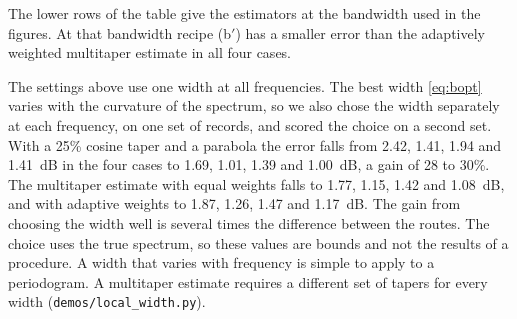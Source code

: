 \documentclass[10pt,twocolumn]{article}
\begin{document}
The lower rows of the table give the estimators at the bandwidth used in the figures. At that bandwidth recipe (b$'$) has a smaller error than the adaptively weighted multitaper estimate in all four cases.

The settings above use one width at all frequencies. The best width \eqref{eq:bopt} varies with the curvature of the spectrum, so we also chose the width separately at each frequency, on one set of records, and scored the choice on a second set. With a 25\% cosine taper and a parabola the error falls from 2.42, 1.41, 1.94 and 1.41~dB in the four cases to 1.69, 1.01, 1.39 and 1.00~dB, a gain of 28 to 30\%. The multitaper estimate with equal weights falls to 1.77, 1.15, 1.42 and 1.08~dB, and with adaptive weights to 1.87, 1.26, 1.47 and 1.17~dB. The gain from choosing the width well is several times the difference between the routes. The choice uses the true spectrum, so these values are bounds and not the results of a procedure. A width that varies with frequency is simple to apply to a periodogram. A multitaper estimate requires a different set of tapers for every width (\texttt{demos/local\_width.py}).
\end{document}

